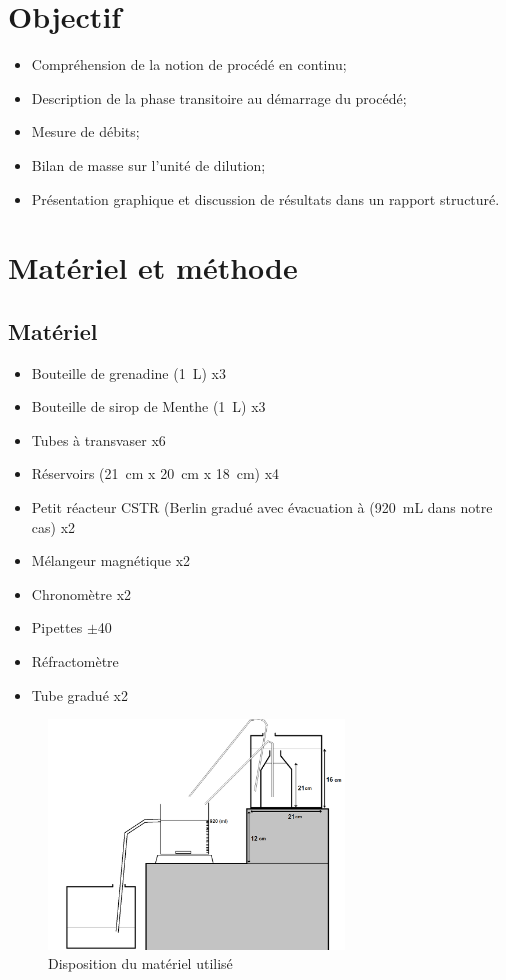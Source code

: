\documentclass[a4paper,11pt, french]{article}
\begin{document}
\thispagestyle{empty}



\section{Objectif}
\begin{itemize}
	\item Compréhension de la notion de procédé en continu;
	\item Description de la phase transitoire au démarrage du procédé;
	\item Mesure de débits;
	\item Bilan de masse sur l'unité de dilution;
	\item Présentation graphique et discussion de résultats dans un rapport structuré.
\end{itemize}

\section{Matériel et méthode}
	\subsection{Matériel}
		\begin{itemize}
			\item Bouteille de grenadine (\SI{1}{\liter}) x3
			\item Bouteille de sirop de Menthe (\SI{1}{\liter}) x3
			\item Tubes à transvaser x6
			\item Réservoirs (\SI{21}{\centi\meter} x \SI{20}{\centi\meter} x \SI{18}{\centi\meter}) x4
			\item Petit réacteur CSTR (Berlin gradué avec évacuation à (\SI{920}{\milli\liter} dans notre cas) x2
			\item Mélangeur magnétique x2
			\item Chronomètre x2
			\item Pipettes $\pm$40
			\item Réfractomètre
			\item Tube gradué x2	
		\end{itemize}
		\begin{figure}[h]
			\centering
			\includegraphics[width=0.7\textwidth]{pictures/materiel.png}
			\caption{Disposition du matériel utilisé}
		\end{figure}	
		
\end{document}
